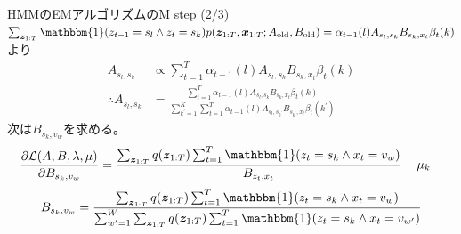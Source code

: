 \documentclass[aspectratio=169,unicode,dvipdfmx,14pt]{beamer}
\begin{document}
\begin{frame}{HMMのEMアルゴリズムのM step (2/3)}
\FontMath
$\sum_{\bm{z}_{1:T}}\mathbbm{1}( z_{t-1} = s_l \wedge z_t = s_k ) 
p(\bm{z}_{1:T} , \bm{x}_{1:T}; A_{\mbox{\scriptsize old}}, B_{\mbox{\scriptsize old}})
= \alpha_{t-1}(l) A_{s_l,s_k} B_{s_k,x_t} \beta_t(k)$より
\begin{align}
A_{s_l, s_k} & \propto \sum_{t=1}^T \alpha_{t-1}(l) A_{s_l,s_k} B_{s_k,x_t} \beta_t(k)
\\
\therefore A_{s_l, s_k} & = 
\frac{ \sum_{t=1}^T \alpha_{t-1}(l) A_{s_l,s_k} B_{s_k,x_t} \beta_t(k) }
{ \sum_{k^\prime=1}^K \sum_{t=1}^T \alpha_{t-1}(l) A_{s_l,s_{k^\prime}} B_{s_{k^\prime},x_t} \beta_t(k^\prime) }
\end{align}
次は$B_{s_k,v_w}$を求める。
\begin{align}
\frac{\partial \mathcal{L}(A, B, \lambda, \mu) }{\partial B_{s_k, v_w}}
& = 
\frac{ \sum_{\bm{z}_{1:T}} q(\bm{z}_{1:T}) \sum_{t=1}^T 
\mathbbm{1}( z_t = s_k \wedge x_t = v_w ) }{ B_{z_t,x_t} }
- \mu_k
\end{align}
\begin{align}
B_{s_k, v_w} = \frac{
\sum_{\bm{z}_{1:T}} q(\bm{z}_{1:T}) \sum_{t=1}^T 
\mathbbm{1}( z_t = s_k \wedge x_t = v_w ) }{
\sum_{w^\prime=1}^W \sum_{\bm{z}_{1:T}} q(\bm{z}_{1:T}) \sum_{t=1}^T 
\mathbbm{1}( z_t = s_k \wedge x_t = v_{w^\prime} ) }
\end{align}
\end{frame}
\end{document}
